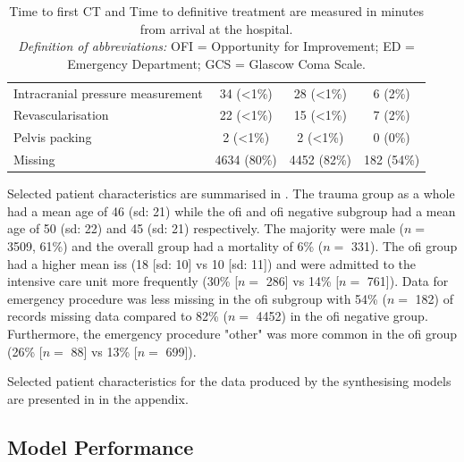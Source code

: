 \documentclass[12pt, letterpaper]{article}
\begin{document}
\begin{table}[t!]
{\begin{tabular}{lccc}
            \hspace{3mm}Intracranial pressure measurement & 34 (\textless1\%) & 28 (\textless1\%) & 6 (2\%)          \\
            \hspace{3mm}Revascularisation                 & 22 (\textless1\%) & 15 (\textless1\%) & 7 (2\%)          \\
            \hspace{3mm}Pelvis packing                    & 2 (\textless1\%)  & 2 (\textless1\%)  & 0 (0\%)          \\
            \hspace{3mm}Missing                           & 4634 (80\%)       & 4452 (82\%)       & 182 (54\%)       \\
            \bottomrule
        \end{tabular}
    }
    \caption*{\scriptsize Time to first CT and Time to definitive treatment are measured in minutes from arrival at the hospital.\\
        \textit{Definition of abbreviations:} OFI = Opportunity for Improvement; ED = Emergency Department; GCS = Glascow Coma Scale.}
\end{table}

Selected patient characteristics are summarised in . The trauma group as a whole had a mean age of 46 (\acrshort{sd}: 21) while the \acrshort{ofi} and \acrshort{ofi} negative subgroup had a mean age of 50 (\acrshort{sd}: 22) and 45 (\acrshort{sd}: 21) respectively. The majority were male ($n = $ \num{3509}, 61\%) and the overall group had a mortality of 6\% ($n = $ \num{331}). The \acrshort{ofi} group had a higher mean \acrshort{iss} (18 [\acrshort{sd}: 10] vs 10 [\acrshort{sd}: 11]) and were admitted to the intensive care unit more frequently (30\% [$n = $ \num{286}] vs 14\% [$n = $ \num{761}]). Data for emergency procedure was less missing in the \acrshort{ofi} subgroup with 54\% ($n = $ 182) of records missing data compared to 82\% ($n = $ \num{4452}) in the \acrshort{ofi} negative group. Furthermore, the emergency procedure "other" was more common in the \acrshort{ofi} group (26\% [$n = $ \num{88}] vs 13\% [$n = $ \num{699}]).

Selected patient characteristics for the data produced by the synthesising models are presented in  in the appendix.

\subsection{Model Performance}
\end{document}
